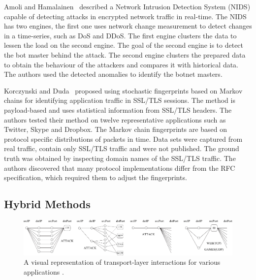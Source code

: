 Amoli and Hamalainen~\cite{Amoli-2013-real} described a Network Intrusion Detection System (NIDS) capable of detecting attacks in encrypted network traffic in real-time. The NIDS has two engines, the first one uses network change measurement to detect changes in a time-series, such as DoS and DDoS. The first engine clusters the data to lessen the load on the second engine. The goal of the second engine is to detect the bot master behind the attack. The second engine clusters the prepared data to obtain the behaviour of the attackers and compares it with historical data. The authors used the detected anomalies to identify the botnet masters.

Korczynski and Duda~\cite{Korczynski-2014-Markov} proposed using stochastic fingerprints based on Markov chains for identifying application traffic in SSL/TLS sessions. The method is payload-based and uses statistical information from SSL/TLS headers. The authors tested their method on twelve representative applications such as Twitter, Skype and Dropbox. The Markov chain fingerprints are based on protocol specific distributions of packets in time. Data sets were captured from real traffic, contain only SSL/TLS traffic and were not published. The ground truth was obtained by inspecting domain names of the SSL/TLS traffic. The authors discovered that many protocol implementations differ from the RFC specification, which required them to adjust the fingerprints.

\subsection{Hybrid Methods}\label{subsec:hybrid}

\begin{figure}[!t]
	\begin{center}
		\includegraphics[width=0.9\linewidth]{figures/graphlets}
		\caption{A visual representation of transport-layer interactions for various applications \cite{Karagiannis-2005-BLINC}.} \label{fig:graphlets}
	\end{center}
\end{figure}

